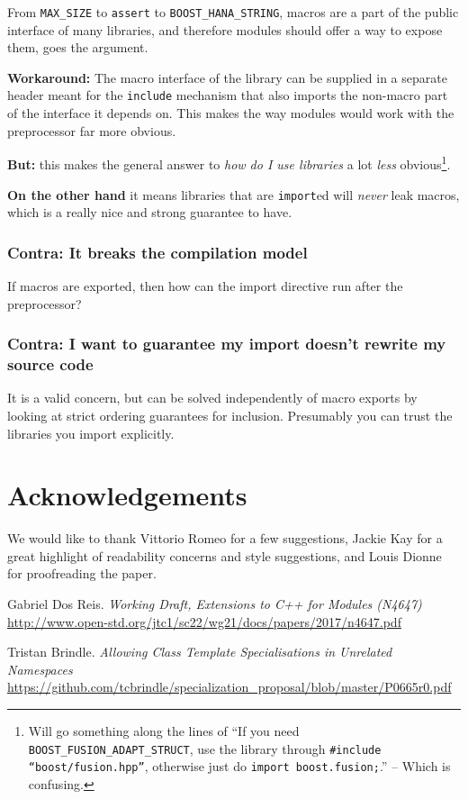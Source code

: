 \documentclass[reqno]{article}
\begin{document}
From \texttt{MAX\_SIZE} to \texttt{assert} to \texttt{BOOST\_HANA\_STRING},
macros are a part of the public interface of many libraries, and therefore
modules should offer a way to expose them, goes the argument.

\textbf{Workaround:} The macro interface of the library can be supplied in a
separate header meant for the \texttt{include} mechanism that also imports the
non-macro part of the interface it depends on. This makes the way modules would
work with the preprocessor far more obvious.

\textbf{But:} this makes the general answer to \emph{how do I use libraries} a
lot \emph{less} obvious\footnote{Will go something along the lines of ``If you
need \texttt{BOOST\_FUSION\_ADAPT\_STRUCT}, use the library through
\texttt{\#include “boost/fusion.hpp”}, otherwise just do 
\texttt{import boost.fusion;}.'' -- Which is confusing.}.

\textbf{On the other hand} it means libraries that are \texttt{import}ed will
\emph{never} leak macros, which is a really nice and strong guarantee to have.


\subsubsection{Contra: It breaks the compilation model}

If macros are exported, then how can the import directive run after the
preprocessor?


\subsubsection{Contra: I want to guarantee my import doesn't rewrite my source code}

It is a valid concern, but can be solved independently of macro exports by
looking at strict ordering guarantees for inclusion. Presumably you can trust
the libraries you import explicitly.


\section{Acknowledgements}
We would like to thank Vittorio Romeo for a few suggestions, Jackie Kay for a
great highlight of readability concerns and style suggestions, and Louis Dionne
for proofreading the paper.



\begin{thebibliography}{9}

    Gabriel Dos Reis.
        \textit{Working Draft, Extensions to C++ for Modules (N4647)}
        \url{http://www.open-std.org/jtc1/sc22/wg21/docs/papers/2017/n4647.pdf}

    Tristan Brindle.
        \textit{Allowing Class Template Specialisations in Unrelated Namespaces}
        \url{https://github.com/tcbrindle/specialization_proposal/blob/master/P0665r0.pdf}

\end{thebibliography}
\end{document}
